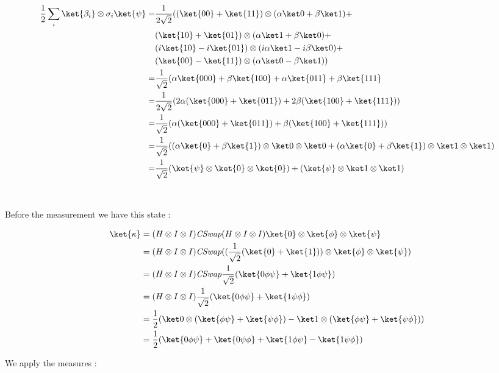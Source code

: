 \begin{align*}
  \frac 1 2 \sum_i \ket{\beta_i} \otimes \sigma_i \ket{\psi}
  =& \frac{1}{2\sqrt 2}((\ket{00}+\ket{11}) \otimes (\alpha \ket 0 + \beta \ket 1)+\\
  &(\ket{10}+\ket{01}) \otimes (\alpha \ket 1 + \beta \ket 0)+\\
  &(i\ket{10} - i \ket{01}) \otimes (i\alpha \ket 1 - i\beta \ket 0)+\\
  &(\ket{00} - \ket{11}) \otimes (\alpha \ket 0 - \beta \ket 1)) \\
  =& \frac{1}{\sqrt 2}(\alpha \ket{000} + \beta \ket{100} + \alpha \ket{011} +
  \beta \ket{111} \\
  =& \frac{1}{2\sqrt 2}(2\alpha(\ket{000} + \ket{011}) + 2\beta(\ket{100} +
  \ket{111})) \\
  =& \frac{1}{\sqrt 2}(\alpha(\ket{000} + \ket{011}) + \beta(\ket{100} + \ket{111}))
    \\
  =& \frac{1}{\sqrt 2}(
    (\alpha \ket{0} + \beta \ket{1}) \otimes \ket 0 \otimes \ket 0 + 
    (\alpha \ket{0} + \beta \ket{1}) \otimes \ket 1 \otimes \ket 1) \\
  =& \frac{1}{\sqrt 2}(\ket{\psi} \otimes \ket{0} \otimes \ket{0}) +
    (\ket{\psi} \otimes \ket 1 \otimes \ket 1)
\end{align*}

~

Before the measurement we have this state :

\begin{align*}
  \ket{\kappa}&=(H \otimes I \otimes I) \CSwap (H \otimes I \otimes I) \ket{0} \otimes
  \ket{\phi} \otimes \ket{\psi} \\
  &= (H \otimes I \otimes I) \CSwap ((\frac{1}{\sqrt 2}(\ket{0} + \ket{1}))
  \otimes \ket{\phi} \otimes \ket{\psi}) \\
  &= (H \otimes I \otimes I) \CSwap \frac{1}{\sqrt 2}
     (\ket{0\phi\psi} + \ket{1\phi\psi}) \\
  &= (H \otimes I \otimes I)\frac{1}{\sqrt 2}
     (\ket{0\phi\psi} + \ket{1\psi\phi}) \\
  &= \frac 1 2(\ket 0 \otimes (\ket{\phi\psi} + \ket{\psi\phi}) -
               \ket 1 \otimes (\ket{\phi\psi} + \ket{\psi\phi})) \\
  &= \frac 1 2(\ket{0\phi\psi} + \ket{0\psi\phi} +
               \ket{1\phi\psi} - \ket{1\psi\phi})
\end{align*}

We apply the measures :

